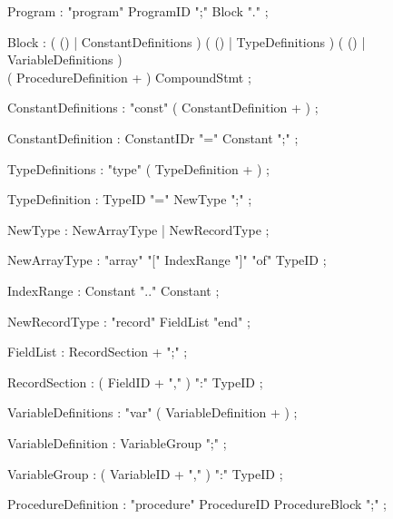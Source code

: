 

\begin{rail}
Program : "program" ProgramID ";" Block "." ;
\end{rail}
\begin{rail}
Block : ( () | ConstantDefinitions )
	( () | TypeDefinitions )
	( () | VariableDefinitions ) \\
	( ProcedureDefinition + )
	CompoundStmt
      ;
\end{rail}
\begin{rail}
ConstantDefinitions : "const" ( ConstantDefinition + ) ;
\end{rail}
\begin{rail}
ConstantDefinition : ConstantIDr "=" Constant ";" ;
\end{rail}
\begin{rail}
TypeDefinitions : "type" ( TypeDefinition + ) ;
\end{rail}
\begin{rail}
TypeDefinition : TypeID "=" NewType ";" ;
\end{rail}
\begin{rail}
NewType : NewArrayType | NewRecordType ;
\end{rail}
\begin{rail}
NewArrayType : "array" "[" IndexRange "]" "of" TypeID ;
\end{rail}
\begin{rail}
IndexRange : Constant ".." Constant ;
\end{rail}
\begin{rail}
NewRecordType : "record" FieldList "end" ;
\end{rail}
\begin{rail}
FieldList : RecordSection + ";" ;
\end{rail}
\begin{rail}
RecordSection : ( FieldID + "," ) ":" TypeID ;
\end{rail}
\begin{rail}
VariableDefinitions : "var" ( VariableDefinition + ) ;
\end{rail}
\begin{rail}
VariableDefinition : VariableGroup ";" ;
\end{rail}
\begin{rail}
VariableGroup : ( VariableID + "," ) ":" TypeID ;
\end{rail}
\begin{rail}
ProcedureDefinition : "procedure" ProcedureID ProcedureBlock ";" ;
\end{rail}
